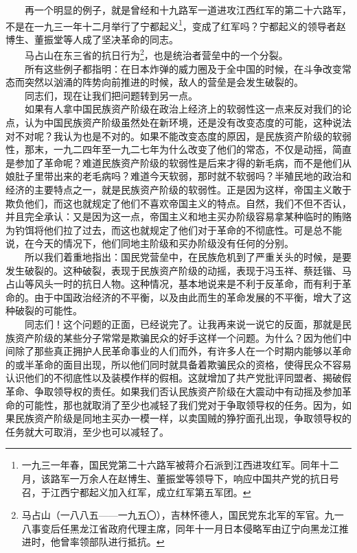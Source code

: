 \documentclass[cn,11pt,chinese]{elegantbook}
\begin{document}
　　再一个明显的例子，就是曾经和十九路军一道进攻江西红军的第二十六路军，不是在一九三一年十二月举行了宁都起义\footnote[14]{ 一九三一年春，国民党第二十六路军被蒋介石派到江西进攻红军。同年十二月，该路军一万余人在赵博生、董振堂等领导下，响应中国共产党的抗日号召，于江西宁都起义加入红军，成立红军第五军团。}，变成了红军吗？宁都起义的领导者赵博生、董振堂等人成了坚决革命的同志。\\
　　马占山在东三省的抗日行为\footnote[15]{ 马占山（一八八五——一九五〇），吉林怀德人，国民党东北军的军官。九一八事变后任黑龙江省政府代理主席，同年十一月日本侵略军由辽宁向黑龙江推进时，他曾率领部队进行抵抗。}，也是统治者营垒中的一个分裂。\\
　　所有这些例子都指明：在日本炸弹的威力圈及于全中国的时候，在斗争改变常态而突然以汹涌的阵势向前推进的时候，敌人的营垒是会发生破裂的。\\
　　同志们，现在让我们把问题转到另一点。\\
　　如果有人拿中国民族资产阶级在政治上经济上的软弱性这一点来反对我们的论点，认为中国民族资产阶级虽然处在新环境，还是没有改变态度的可能，这种说法对不对呢？我认为也是不对的。如果不能改变态度的原因，是民族资产阶级的软弱性，那末，一九二四年至一九二七年为什么改变了他们的常态，不仅是动摇，简直是参加了革命呢？难道民族资产阶级的软弱性是后来才得的新毛病，而不是他们从娘肚子里带出来的老毛病吗？难道今天软弱，那时就不软弱吗？半殖民地的政治和经济的主要特点之一，就是民族资产阶级的软弱性。正是因为这样，帝国主义敢于欺负他们，而这也就规定了他们不喜欢帝国主义的特点。自然，我们不但不否认，并且完全承认：又是因为这一点，帝国主义和地主买办阶级容易拿某种临时的贿赂为钓饵将他们拉了过去，而这也就规定了他们对于革命的不彻底性。可是总不能说，在今天的情况下，他们同地主阶级和买办阶级没有任何的分别。\\
　　所以我们着重地指出：国民党营垒中，在民族危机到了严重关头的时候，是要发生破裂的。这种破裂，表现于民族资产阶级的动摇，表现于冯玉祥、蔡廷锴、马占山等风头一时的抗日人物。这种情况，基本地说来是不利于反革命，而有利于革命的。由于中国政治经济的不平衡，以及由此而生的革命发展的不平衡，增大了这种破裂的可能性。\\
　　同志们！这个问题的正面，已经说完了。让我再来说一说它的反面，那就是民族资产阶级的某些分子常常是欺骗民众的好手这样一个问题。为什么？因为他们中间除了那些真正拥护人民革命事业的人们而外，有许多人在一个时期内能够以革命的或半革命的面目出现，所以他们同时就具备着欺骗民众的资格，使得民众不容易认识他们的不彻底性以及装模作样的假相。这就增加了共产党批评同盟者、揭破假革命、争取领导权的责任。如果我们否认民族资产阶级在大震动中有动摇及参加革命的可能性，那也就取消了至少也减轻了我们党对于争取领导权的任务。因为，如果民族资产阶级是同地主买办一模一样，以卖国贼的狰狞面孔出现，争取领导权的任务就大可取消，至少也可以减轻了。\\
\end{document}
